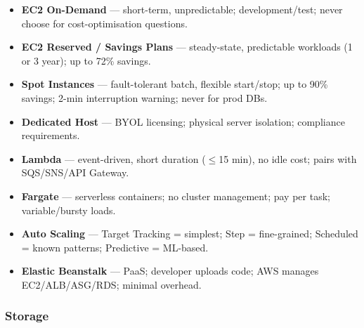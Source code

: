 \begin{keyfacts}
\begin{itemize}
  \item \textbf{EC2 On-Demand} --- short-term, unpredictable; development/test; never choose for cost-optimisation questions.
  \item \textbf{EC2 Reserved / Savings Plans} --- steady-state, predictable workloads (1 or 3 year); up to 72\% savings.
  \item \textbf{Spot Instances} --- fault-tolerant batch, flexible start/stop; up to 90\% savings; 2-min interruption warning; never for prod DBs.
  \item \textbf{Dedicated Host} --- BYOL licensing; physical server isolation; compliance requirements.
  \item \textbf{Lambda} --- event-driven, short duration ($\leq$15 min), no idle cost; pairs with SQS/SNS/API Gateway.
  \item \textbf{Fargate} --- serverless containers; no cluster management; pay per task; variable/bursty loads.
  \item \textbf{Auto Scaling} --- Target Tracking = simplest; Step = fine-grained; Scheduled = known patterns; Predictive = ML-based.
  \item \textbf{Elastic Beanstalk} --- PaaS; developer uploads code; AWS manages EC2/ALB/ASG/RDS; minimal overhead.
\end{itemize}
\end{keyfacts}

\subsubsection{Storage}


